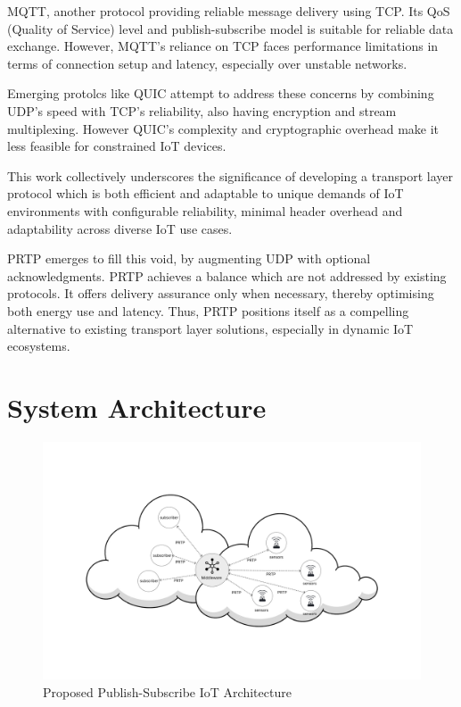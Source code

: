 \documentclass[lettersize,journal]{IEEEtran}
\begin{document}
MQTT, another protocol providing reliable message delivery using TCP. Its QoS (Quality of Service) level and publish-subscribe model is suitable for reliable data exchange. However, MQTT's reliance on TCP faces performance limitations in terms of connection setup and latency, especially over unstable networks.

Emerging protolcs like QUIC attempt to address these concerns by combining UDP's speed with TCP's reliability, also having encryption and stream multiplexing. However QUIC's complexity and cryptographic overhead make it less feasible for constrained IoT devices.

This work collectively underscores the significance of developing a transport layer protocol which is both efficient and adaptable to unique demands of IoT environments with configurable reliability, minimal header overhead and adaptability across diverse IoT use cases.

PRTP emerges to fill this void, by augmenting UDP with optional acknowledgments. PRTP achieves a balance which are not addressed by existing protocols. It offers delivery assurance only when necessary, thereby optimising both energy use and latency. Thus, PRTP positions itself as a compelling alternative to existing transport layer solutions, especially in dynamic IoT ecosystems.

\section{System Architecture}
\begin{figure}[htbp]
    \centering
    \includegraphics[width=0.8\columnwidth]{Figure/architecture.png}
    \caption{Proposed Publish-Subscribe IoT Architecture}
    \label{fig:iot_architecture}
\end{figure}
\end{document}
